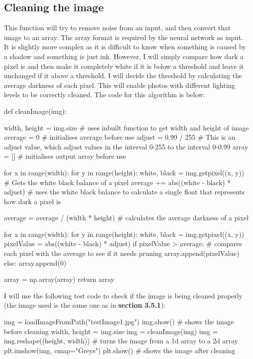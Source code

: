 \documentclass{report}
\begin{document}
\subsection{Cleaning the image}
This function will try to remove noise from an input, and then convert that image to an array. The array format is required by the neural network as input. It is slightly more complex as it is difficult to know when something is caused by a shadow and something is just ink. However, I will simply compare how dark a pixel is and then make it completely white if it is below a threshold and leave it unchanged if it above a threshold. I will decide the threshold by calculating the average darkness of each pixel. This will enable photos with different lighting levels to be correctly cleaned. The code for this algorithm is below:
\begin{python}
def cleanImage(img):

    width, height = img.size  # uses inbuilt function to get width and height of image
    average = 0  # initialises average before use
    adjust = 0.99 / 255  # This is an adjust value, which adjust values in the interval 0-255 to the interval 0-0.99
    array = []  # initialises output array before use

    for x in range(width):
        for y in range(height):
            white, black = img.getpixel((x, y))  # Gets the white black balance of a pixel
            average += abs((white - black) * adjust)  # uses the white black balance to calculate a single float that represents how dark a pixel is

    average = average / (width * height) # calculates the average darkness of a pixel

    for x in range(width):
        for y in range(height):
            white, black = img.getpixel((x, y))
            pixelValue = abs((white - black) * adjust)
            if pixelValue > average:  # compares each pixel with the average to see if it needs pruning
                array.append(pixelValue)
            else:
                array.append(0)

    array = np.array(array)
    return array
\end{python}
I will use the following test code to check if the image is being cleaned properly (the image used is the same one as in \textbf{section 3.5.1}):
\begin{python}
img = loadImageFromPath("testImage1.jpg")
img.show()  # shows the image before cleaning
width, height = img.size
img = cleanImage(img)
img = img.reshape((height, width)) # turns the image from a 1d array to a 2d array
plt.imshow(img, cmap="Greys")
plt.show()  # shows the image after cleaning
\end{python}
\end{document}
